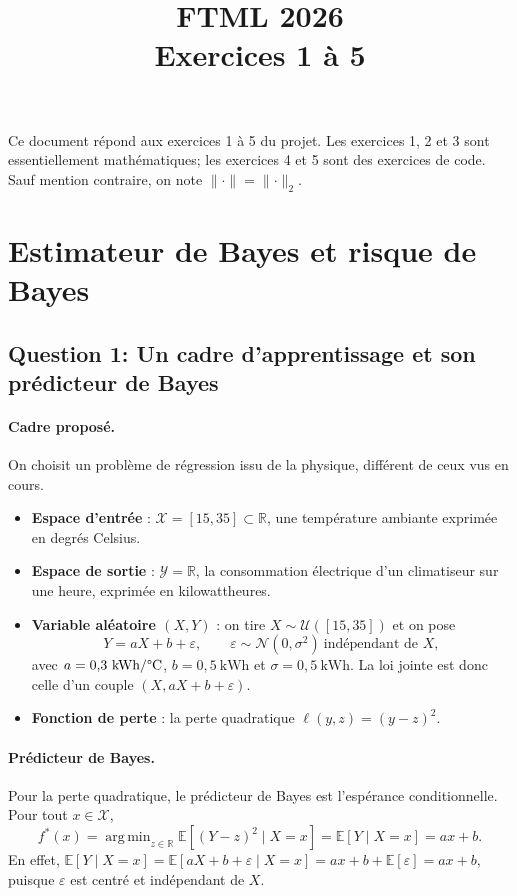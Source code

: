 \documentclass[11pt,a4paper]{article}
\title{\textbf{FTML 2026}\\[2mm]
\large Exercices 1 à 5}
\author{}
\date{}
\newcommand{\R}{\mathbb{R}}
\newcommand{\E}{\mathbb{E}}
\newcommand{\X}{\mathcal{X}}
\newcommand{\Y}{\mathcal{Y}}
\newcommand{\fstar}{f^{*}}
\DeclareMathOperator*{\argmin}{arg\,min}
\theoremstyle{plain}
\begin{document}
\maketitle

\noindent
Ce document répond aux exercices 1 à 5 du projet. Les exercices 1, 2 et 3 sont
essentiellement mathématiques; les exercices 4 et 5 sont des exercices de code.
Sauf mention contraire, on note
$\lVert\cdot\rVert=\lVert\cdot\rVert_2$.

\tableofcontents

\section{Estimateur de Bayes et risque de Bayes}

\subsection*{Question 1: Un cadre d'apprentissage et son prédicteur de Bayes}

\paragraph{Cadre proposé.} On choisit un problème de régression issu de la
physique, différent de ceux vus en cours.
\begin{itemize}[nosep]
  \item \textbf{Espace d'entrée} : $\X=[15,35]\subset\R$, une température
        ambiante exprimée en degrés Celsius.
  \item \textbf{Espace de sortie} : $\Y=\R$, la consommation électrique d'un
        climatiseur sur une heure, exprimée en kilowattheures.
  \item \textbf{Variable aléatoire $(X,Y)$} : on tire
        $X\sim\mathcal{U}([15,35])$ et on pose
        \[
            Y = aX + b + \varepsilon,
            \qquad \varepsilon\sim\mathcal{N}(0,\sigma^2)\ \text{indépendant de }X,
        \]
        avec $a=0{,}3~\text{kWh/\textdegree C}$, $b=0{,}5~\text{kWh}$ et
        $\sigma=0{,}5~\text{kWh}$. La loi jointe est donc celle d'un couple
        $(X, aX+b+\varepsilon)$.
  \item \textbf{Fonction de perte} : la perte quadratique
        $\ell(y,z)=(y-z)^2$.
\end{itemize}

\paragraph{Prédicteur de Bayes.} Pour la perte quadratique, le prédicteur de
Bayes est l'espérance conditionnelle. Pour tout $x\in\X$,
\[
    \fstar(x)=\argmin_{z\in\R}\E\!\left[(Y-z)^2\mid X=x\right]
            =\E[Y\mid X=x]
            =a x + b .
\]
En effet, $\E[Y\mid X=x]=\E[aX+b+\varepsilon\mid X=x]=ax+b+\E[\varepsilon]=ax+b$,
puisque $\varepsilon$ est centré et indépendant de $X$.
\end{document}
